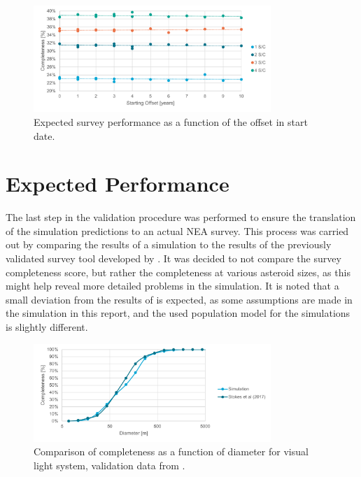 \begin{figure}[htbp]
 \centering
 \includegraphics[width=0.8\textwidth]{img/validation_starting_year.pdf}
 \caption{Expected survey performance as a function of the offset in start date.}
 \label{fig:validation_starting_year}
\end{figure}



\section{Expected Performance}
\label{sec:vvperformance}

The last step in the validation procedure was performed to ensure the translation of the simulation predictions to an actual NEA survey. This process was carried out by comparing the results of a simulation to the results of the previously validated survey tool developed by \cite{2017NEOSDT}. It was decided to not compare the survey completeness score, but rather the completeness at various asteroid sizes, as this might help reveal more detailed problems in the simulation. It is noted that a small deviation from the results of \cite{2017NEOSDT} is expected, as some assumptions are made in the simulation in this report, and the used population model for the simulations is slightly different.

\begin{figure}[htbp]
 \centering
 \includegraphics[width=0.8\textwidth]{img/validation_completeness_vis.pdf}
 \caption{Comparison of completeness as a function of diameter for visual light system, validation data from \cite{2017NEOSDT}.}
 \label{fig:validation_completeness_vis}
\end{figure}


